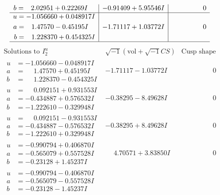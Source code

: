 \documentclass[1p]{elsarticle_modified}
\theoremstyle{definition}
\newcommand{\I}{\sqrt{-1}}
\begin{document}
$$\begin{array}{c|c|c}
\begin{aligned}
b &= \phantom{-}2.02951 + 0.22269 I\end{aligned}
 & -0.91409 + 5.95546 I & \phantom{-0.000000 } 0 \\ \hline\begin{aligned}
u &= -1.056660 + 0.048917 I \\
a &= \phantom{-}1.47570 - 0.45195 I \\
b &= \phantom{-}1.228370 + 0.454325 I\end{aligned}
 & -1.71117 + 1.03772 I & \phantom{-0.000000 } 0\\
 \hline 
 \end{array}$$\newpage$$\begin{array}{c|c|c}  
\text{Solutions to }I^u_{2}& \I (\text{vol} + \sqrt{-1}CS) & \text{Cusp shape}\\
 \hline 
\begin{aligned}
u &= -1.056660 - 0.048917 I \\
a &= \phantom{-}1.47570 + 0.45195 I \\
b &= \phantom{-}1.228370 - 0.454325 I\end{aligned}
 & -1.71117 - 1.03772 I & \phantom{-0.000000 } 0 \\ \hline\begin{aligned}
u &= \phantom{-}0.092151 + 0.931553 I \\
a &= -0.434887 + 0.576532 I \\
b &= -1.222610 - 0.329948 I\end{aligned}
 & -0.38295 - 8.49628 I & \phantom{-0.000000 } 0 \\ \hline\begin{aligned}
u &= \phantom{-}0.092151 - 0.931553 I \\
a &= -0.434887 - 0.576532 I \\
b &= -1.222610 + 0.329948 I\end{aligned}
 & -0.38295 + 8.49628 I & \phantom{-0.000000 } 0 \\ \hline\begin{aligned}
u &= -0.990794 + 0.406870 I \\
a &= -0.565079 + 0.557528 I \\
b &= -0.23128 + 1.45237 I\end{aligned}
 & \phantom{-}4.70571 + 3.83850 I & \phantom{-0.000000 } 0 \\ \hline\begin{aligned}
u &= -0.990794 - 0.406870 I \\
a &= -0.565079 - 0.557528 I \\
b &= -0.23128 - 1.45237 I\end{aligned}

\end{array}$$
\end{document}
